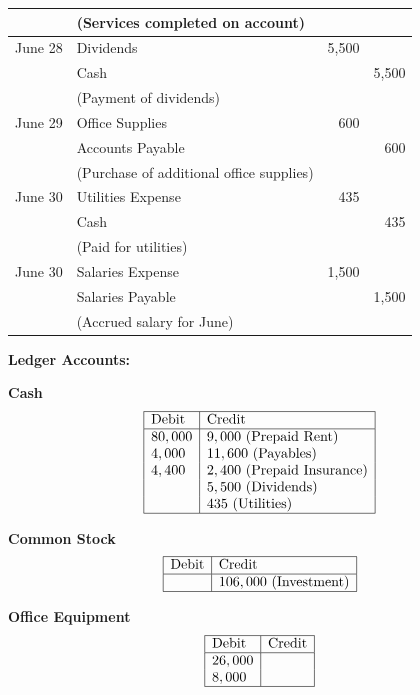 \documentclass[12pt,a4paper]{book}
\begin{document}
\begin{center}
\begin{tabular}{|l|l|r|r|}
        & (Services completed on account) & & \\
\hline
June 28 & Dividends & 5,500 & \\
        & \quad Cash & & 5,500 \\
        & (Payment of dividends) & & \\
\hline
June 29 & Office Supplies & 600 & \\
        & \quad Accounts Payable & & 600 \\
        & (Purchase of additional office supplies) & & \\
\hline
June 30 & Utilities Expense & 435 & \\
        & \quad Cash & & 435 \\
        & (Paid for utilities) & & \\
\hline
June 30 & Salaries Expense & 1,500 & \\
        & \quad Salaries Payable & & 1,500 \\
        & (Accrued salary for June) & & \\
\hline
\end{tabular}
\end{center}

\vspace{0.5cm}
\textbf{Ledger Accounts:}

\vspace{0.3cm}
\textbf{Cash}
\[
\begin{array}{|l|l|}
\hline
\text{Debit} & \text{Credit} \\
\hline
80,000 & 9,000 \ (\text{Prepaid Rent}) \\
4,000  & 11,600 \ (\text{Payables}) \\
4,400  & 2,400 \ (\text{Prepaid Insurance}) \\
       & 5,500 \ (\text{Dividends}) \\
       & 435 \ (\text{Utilities}) \\
\hline
\end{array}
\]

\vspace{0.3cm}
\textbf{Common Stock}
\[
\begin{array}{|l|l|}
\hline
\text{Debit} & \text{Credit} \\
\hline
 & 106,000 \ (\text{Investment}) \\
\hline
\end{array}
\]

\vspace{0.3cm}
\textbf{Office Equipment}
\[
\begin{array}{|l|l|}
\hline
\text{Debit} & \text{Credit} \\
\hline
26,000 & \\
8,000  & \\
\hline
\end{array}
\]
\end{document}
